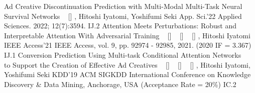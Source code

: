 
\begin{publications}
    \publication
        {Ad Creative Discontinuation Prediction with Multi-Modal Multi-Task Neural Survival Networks}
        {
            ~ [\href{https://www.mdpi.com/2076-3417/12/7/3594}{\small{\linkSymbol}}]
        }
        {\underline{}, Hitoshi Iyatomi, Yoshifumi Seki}
        {App. Sci.'22} {Applied Sciences. 2022; 12(7):3594.} {IJ.2}
    \publication
        {Attention Meets Perturbations: Robust and Interpretable Attention With Adversarial Training}
        {
            ~ [\href{https://ieeexplore.ieee.org/document/9467291}{\small{\linkSymbol}}]
            ~ [\href{https://arxiv.org/abs/2009.12064}{\small{\arxivSymbol}}]
            ~ [\href{https://github.com/shunk031/attention-meets-perturbation}{\small{\githubSymbol}}]
        }
        {\underline{}, Hitoshi Iyatomi}
        {IEEE Access'21} {IEEE Access, vol. 9, pp. 92974 - 92985, 2021. (2020 IF = 3.367)} {IJ.1}
    \publication
        {Conversion Prediction Using Multi-task Conditional Attention Networks \\ to Support the Creation of Effective Ad Creatives}
        {
            ~ [\href{https://dl.acm.org/doi/10.1145/3292500.3330789}{\small{\linkSymbol}}]
            ~ [\href{https://arxiv.org/abs/1905.07289}{\small{\arxivSymbol}}]
            ~ [\href{https://github.com/shunk031/Multi-task-Conditional-Attention-Networks}{\small{\githubSymbol}}]
        }
        {\underline{}, Hitoshi Iyatomi, Yoshifumi Seki}
        {KDD'19} {ACM SIGKDD International Conference on Knowledge Discovery \& Data Mining, Anchorage, USA (Acceptance Rate = 20\%)} {IC.2}
\end{publications}

